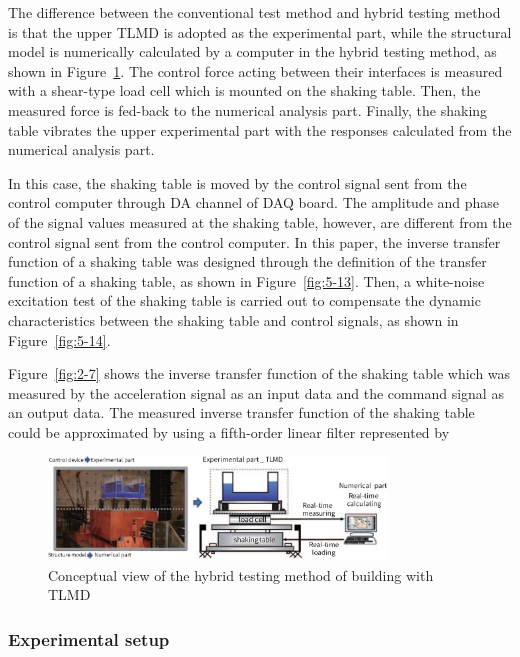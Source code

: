 The difference between the conventional test method and hybrid testing method is that the upper TLMD is adopted as the experimental part, while the structural model is numerically calculated by a computer in the hybrid testing method, as shown in Figure~\ref{fig:5-12}. The control force acting between their interfaces is measured with a shear-type load cell which is mounted on the shaking table. Then, the measured force is fed-back to the numerical analysis part. Finally, the shaking table vibrates the upper experimental part with the responses calculated from the numerical analysis part.

In this case, the shaking table is moved by the control signal sent from the control computer through DA channel of DAQ board. The amplitude and phase of the signal values measured at the shaking table, however, are different from the control signal sent from the control computer. In this paper, the inverse transfer function of a shaking table was designed through the definition of the transfer function of a shaking table, as shown in Figure~\ref{fig:5-13}. Then, a white-noise excitation test of the shaking table is carried out to compensate the dynamic characteristics between the shaking table and control signals,
as shown in Figure~\ref{fig:5-14}. 

Figure~\ref{fig:2-7} shows the inverse transfer function of the shaking table which was measured by the acceleration signal as an input data and the command signal as an output data. The measured inverse transfer function of the shaking table could be approximated by using a fifth-order linear filter represented by


\begin{figure}[ht]
\centering
\includegraphics[width=0.8\textwidth] {figure/5-12.eps}
\caption{Conceptual view of the hybrid testing method of building with TLMD}
\label{fig:5-12}
\end{figure}




\subsubsection{Experimental setup}

